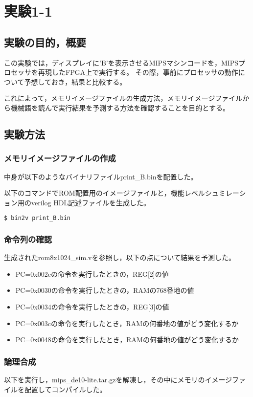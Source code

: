 \section{実験1-1}
\subsection{実験の目的，概要}
この実験では，ディスプレイに'B'を表示させるMIPSマシンコードを，MIPSプロセッサを再現したFPGA上で実行する。
その際，事前にプロセッサの動作について予想しておき，結果と比較する。

これによって，メモリイメージファイルの生成方法，メモリイメージファイルから機械語を読んで実行結果を予測する方法を確認することを目的とする。

\subsection{実験方法}
\subsubsection{メモリイメージファイルの作成}
中身が以下のようなバイナリファイルprint\_B.binを配置した。


以下のコマンドでROM配置用のイメージファイルと，機能レベルシュミレーション用のverilog HDL記述ファイルを生成した。
\begin{lstlisting}[caption={イメージファイルの作成},label={イメージファイルの作成1-1}]
  $ bin2v print_B.bin
\end{lstlisting}

\subsubsection{命令列の確認}
生成されたrom8x1024\_sim.vを参照し，以下の点について結果を予測した。
\begin{itemize}
  \item PC=0x002cの命令を実行したときの，REG[2]の値
  \item PC=0x0030の命令を実行したときの，RAMの768番地の値
  \item PC=0x0034の命令を実行したときの，REG[3]の値
  \item PC=0x003cの命令を実行したとき，RAMの何番地の値がどう変化するか
  \item PC=0x0048の命令を実行したとき，RAMの何番地の値がどう変化するか
\end{itemize}

\subsubsection{論理合成}
以下を実行し，mips\_de10-lite.tar.gzを解凍し，その中にメモリのイメージファイルを配置してコンパイルした。

